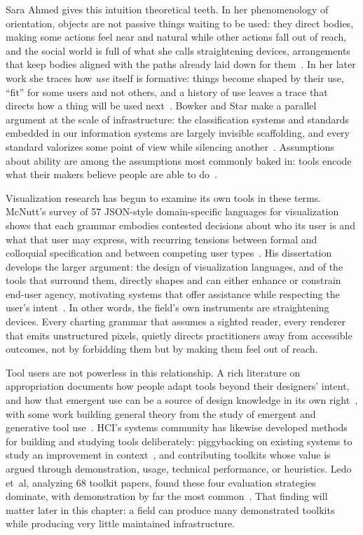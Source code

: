 \documentclass[12pt]{cmuthesis}
\newcommand{\ea}{{et~al\xperiod}\xspace}
\begin{document}
Sara Ahmed gives this intuition theoretical teeth. In her phenomenology of orientation, objects are not passive things waiting to be used: they direct bodies, making some actions feel near and natural while other actions fall out of reach, and the social world is full of what she calls straightening devices, arrangements that keep bodies aligned with the paths already laid down for them~\cite{Ahmed2006Queer}. In her later work she traces how \textit{use} itself is formative: things become shaped by their use, ``fit'' for some users and not others, and a history of use leaves a trace that directs how a thing will be used next~\cite{Ahmed2019WhatsTheUse}. Bowker and Star make a parallel argument at the scale of infrastructure: the classification systems and standards embedded in our information systems are largely invisible scaffolding, and every standard valorizes some point of view while silencing another~\cite{Bowker1999Sorting}. Assumptions about ability are among the assumptions most commonly baked in: tools encode what their makers believe people are able to do~\cite{Wobbrock2011Ability}.
 
Visualization research has begun to examine its own tools in these terms. McNutt's survey of 57 JSON-style domain-specific languages for visualization shows that each grammar embodies contested decisions about who its user is and what that user may express, with recurring tensions between formal and colloquial specification and between competing user types~\cite{McNutt2022}. His dissertation develops the larger argument: the design of visualization languages, and of the tools that surround them, directly shapes and can either enhance or constrain end-user agency, motivating systems that offer assistance while respecting the user's intent~\cite{McNutt2023Understanding}. In other words, the field's own instruments are straightening devices. Every charting grammar that assumes a sighted reader, every renderer that emits unstructured pixels, quietly directs practitioners away from accessible outcomes, not by forbidding them but by making them feel out of reach.
 
Tool users are not powerless in this relationship. A rich literature on appropriation documents how people adapt tools beyond their designers' intent, and how that emergent use can be a source of design knowledge in its own right~\cite{Dix2007, Draxler2012, Tchounikine2016, Salovaara2008}, with some work building general theory from the study of emergent and generative tool use~\cite{Bennett2021, BeaudouinLafon2021}. HCI's systems community has likewise developed methods for building and studying tools deliberately: piggybacking on existing systems to study an improvement in context~\cite{Grevet2015, Herskovitz2023}, and contributing toolkits whose value is argued through demonstration, usage, technical performance, or heuristics. Ledo \ea, analyzing 68 toolkit papers, found these four evaluation strategies dominate, with demonstration by far the most common~\cite{Ledo2018Evaluation}. That finding will matter later in this chapter: a field can produce many demonstrated toolkits while producing very little maintained infrastructure.
 
\end{document}
